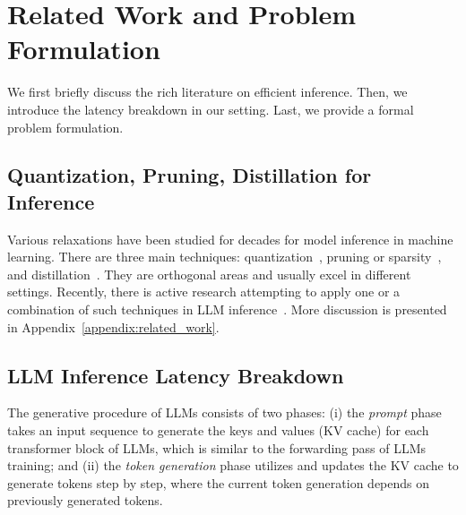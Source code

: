 \section{Related Work and Problem Formulation}
We first briefly discuss the rich literature on efficient inference. Then, we introduce the latency breakdown in our setting. Last, we provide a formal problem formulation. 
\label{sec:obs_computation}



\subsection{Quantization, Pruning, Distillation for Inference}
Various relaxations have been studied for decades for model inference in machine learning. There are three main techniques: quantization~\cite{han2015deep, jacob2018quantization,nagel2019data,zhao2019improving}, pruning or sparsity~\cite{molchanov2016pruning,liu2018rethinking,hoefler2021sparsity}, and distillation~\cite{hinton2015distilling,tang2019distilling,touvron2021training}. They are orthogonal areas and usually excel in different settings. Recently, there is active research attempting to apply one or a combination of such techniques in LLM inference~\cite{yao2022zeroquant,park2022nuqmm,dettmers2022llm,frantar2022gptq,frantar2023massive,bansal2022rethinking,xiao2022smoothquant}. More discussion is presented in Appendix~\ref{appendix:related_work}.

\subsection{LLM Inference Latency Breakdown}
The generative procedure of LLMs consists of two phases: (i) the \textit{prompt} phase takes an input sequence to generate the keys and values (KV cache) for each transformer block of LLMs, which is similar to the forwarding pass of LLMs training; and (ii) the \textit{token generation} phase utilizes and updates the KV cache to generate tokens step by step, where the current token generation depends on previously generated tokens. 

